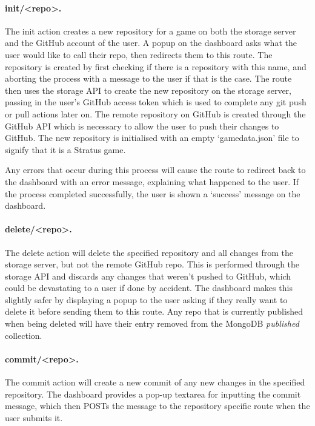 	\paragraph{init/<repo>.}
	The init action creates a new repository for a game on both the storage server and the GitHub account of the user. A popup on the dashboard asks what the user would like to call their repo, then redirects them to this route. The repository is created by first checking if there is a repository with this name, and aborting the process with a message to the user if that is the case. The route then uses the storage API to create the new repository on the storage server, passing in the user's GitHub access token which is used to complete any git push or pull actions later on. The remote repository on GitHub is created through the GitHub API which is necessary to allow the user to push their changes to GitHub. The new repository is initialised with an empty `gamedata.json' file to signify that it is a Stratus game.

	Any errors that occur during this process will cause the route to redirect back to the dashboard with an error message, explaining what happened to the user. If the process completed successfully, the user is shown a `success' message on the dashboard.

	\paragraph{delete/<repo>.}
	The delete action will delete the specified repository and all changes from the storage server, but not the remote GitHub repo. This is performed through the storage API and discards any changes that weren't pushed to GitHub, which could be devastating to a user if done by accident. The dashboard makes this slightly safer by displaying a popup to the user asking if they really want to delete it before sending them to this route. Any repo that is currently published when being deleted will have their entry removed from the MongoDB \emph{published} collection.

	\paragraph{commit/<repo>.}
	The commit action will create a new commit of any new changes in the specified repository. The dashboard provides a pop-up textarea for inputting the commit message, which then POSTs the message to the repository specific route when the user submits it. 

